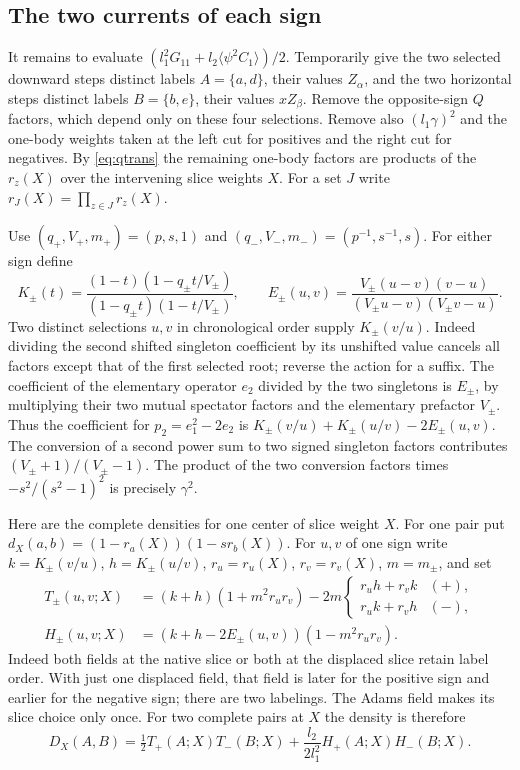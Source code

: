 \subsection{The two currents of each sign}
It remains to evaluate $(l_1^2G_{11}+l_2\langle\psi^2C_1\rangle)/2$.
Temporarily give the two selected downward steps distinct labels
$A=\{a,d\}$, their values $Z_\alpha$, and the two horizontal steps
distinct labels $B=\{b,e\}$, their values $xZ_\beta$. Remove the
opposite-sign $Q$ factors, which depend only on these four selections.
Remove also $(l_1\gamma)^2$ and the one-body weights taken at the left
cut for positives and the right cut for negatives. By
\eqref{eq:qtrans} the remaining one-body factors are products of the
$r_z(X)$ over the intervening slice weights $X$. For a set $J$ write
$r_J(X)=\prod_{z\in J}r_z(X)$.

Use $(q_+,V_+,m_+)=(p,s,1)$ and $(q_-,V_-,m_-)=(p^{-1},s^{-1},s)$.
For either sign define
\[
 K_\pm(t)=\frac{(1-t)(1-q_\pm t/V_\pm)}
                    {(1-q_\pm t)(1-t/V_\pm)},\qquad
 E_\pm(u,v)=\frac{V_\pm(u-v)(v-u)}
                  {(V_\pm u-v)(V_\pm v-u)} .
\]
Two distinct selections $u,v$ in chronological order supply
$K_\pm(v/u)$. Indeed dividing the second shifted singleton coefficient by
its unshifted value cancels all factors except that of the first
selected root; reverse the action for a suffix. The coefficient of the
elementary operator $e_2$ divided by the two singletons is $E_\pm$,
by multiplying their two mutual spectator factors and the elementary
prefactor $V_\pm$. Thus the coefficient for $p_2=e_1^2-2e_2$ is
$K_\pm(v/u)+K_\pm(u/v)-2E_\pm(u,v)$. The conversion of a second
power sum to two signed singleton factors contributes
$(V_\pm+1)/(V_\pm-1)$. The product of the two conversion factors times
$-s^2/(s^2-1)^2$ is precisely $\gamma^2$.

Here are the complete densities for one center of slice weight $X$.
For one pair put $d_X(a,b)=(1-r_a(X))(1-sr_b(X))$.
For $u,v$ of one sign write $k=K_\pm(v/u)$, $h=K_\pm(u/v)$,
$r_u=r_u(X)$, $r_v=r_v(X)$, $m=m_\pm$, and set
\begin{align*}
 T_\pm(u,v;X)
 &= (k+h)(1+m^2r_ur_v)-2m
 \begin{cases}r_u h+r_v k&(+),\\r_u k+r_v h&(-),\end{cases}\\
 H_\pm(u,v;X)&=(k+h-2E_\pm(u,v))(1-m^2r_ur_v).
\end{align*}
Indeed both fields at the native slice or both at the displaced slice
retain label order. With just one displaced field, that field is later
for the positive sign and earlier for the negative sign; there are two
labelings. The Adams field makes its slice choice only once.
For two complete pairs at $X$ the density is therefore
\[
 D_X(A,B)=\tfrac12 T_+(A;X)T_-(B;X)
             +\frac{l_2}{2l_1^2}H_+(A;X)H_-(B;X).
\]

